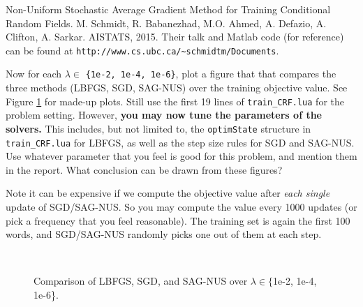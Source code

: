 \documentclass[11pt]{report}
\begin{document}
Non-Uniform Stochastic Average Gradient Method for Training Conditional Random Fields.
M. Schmidt, R. Babanezhad, M.O. Ahmed, A. Defazio, A. Clifton, A. Sarkar. AISTATS, 2015.
%
Their talk and Matlab code (for reference) can be found at
\verb!http://www.cs.ubc.ca/~schmidtm/Documents!.


Now for each $\lambda \in$ \verb!{1e-2, 1e-4, 1e-6}!,
plot a figure that that compares the three methods (LBFGS, SGD, SAG-NUS) over the training objective value.
See Figure \ref{fig:compare_sgd} for made-up plots.
Still use the first 19 lines of \verb!train_CRF.lua! for the problem setting.
However, {\bf you may now tune the parameters of the solvers.}
This includes, but not limited to, the \verb!optimState! structure in \verb!train_CRF.lua! for LBFGS,
as well as the step size rules for SGD and SAG-NUS.
Use whatever parameter that you feel is good for this problem,
and mention them in the report.
What conclusion can be drawn from these figures?

Note it can be expensive if we compute the objective value after \emph{each single} update of SGD/SAG-NUS.
So you may compute the value every 1000 updates (or pick a frequency that you feel reasonable).
The training set is again the first 100 words,
and SGD/SAG-NUS randomly picks one out of them at each step.


\begin{figure}[t]
\centering
{}
~~
~~
\caption{Comparison of LBFGS, SGD, and SAG-NUS over $\lambda \in \{${\sf 1e-2, 1e-4, 1e-6}\}.}
\label{fig:compare_sgd}
\end{figure}
\end{document}

